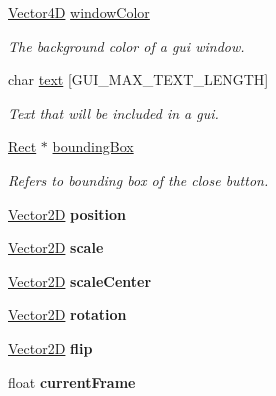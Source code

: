 \begin{DoxyCompactItemize}
\hyperlink{struct_vector4_d}{Vector4D} \hyperlink{structguiwindow__s_aea6170e71a582fa8ea892ae629b9f3fb}{window\+Color}
\begin{DoxyCompactList}\small\item\em The background color of a gui window. \end{DoxyCompactList}\item 
char \hyperlink{structguiwindow__s_ae89913af12503b162dd7fbb8b5969d55}{text} \mbox{[}G\+U\+I\+\_\+\+M\+A\+X\+\_\+\+T\+E\+X\+T\+\_\+\+L\+E\+N\+G\+TH\mbox{]}
\begin{DoxyCompactList}\small\item\em Text that will be included in a gui. \end{DoxyCompactList}\item 
\hyperlink{structrect__s}{Rect} $\ast$ \hyperlink{structguiwindow__s_ac1cd7b4e29cbb1aebb92f3908a901a8f}{bounding\+Box}
\begin{DoxyCompactList}\small\item\em Refers to bounding box of the close button. \end{DoxyCompactList}\item 
\mbox{\label{structguiwindow__s_ae378a51bbd37318bd8bdd3b103737fdd}} 
\hyperlink{struct_vector2_d}{Vector2D} {\bfseries position}
\item 
\mbox{\label{structguiwindow__s_aeeb171eb302bca1f073227ae2ef3ae2b}} 
\hyperlink{struct_vector2_d}{Vector2D} {\bfseries scale}
\item 
\mbox{\label{structguiwindow__s_a051c4e48d8783f0e6a25c2d990c776f0}} 
\hyperlink{struct_vector2_d}{Vector2D} {\bfseries scale\+Center}
\item 
\mbox{\label{structguiwindow__s_a465f32d596c25181f7e11582712684c6}} 
\hyperlink{struct_vector2_d}{Vector2D} {\bfseries rotation}
\item 
\mbox{\label{structguiwindow__s_a4978e49b0f2e65bddec9eb59603a63de}} 
\hyperlink{struct_vector2_d}{Vector2D} {\bfseries flip}
\item 
\mbox{\label{structguiwindow__s_a736e5f29e84d441ad80d28763d11cc45}} 
float {\bfseries current\+Frame}
\end{DoxyCompactItemize}


